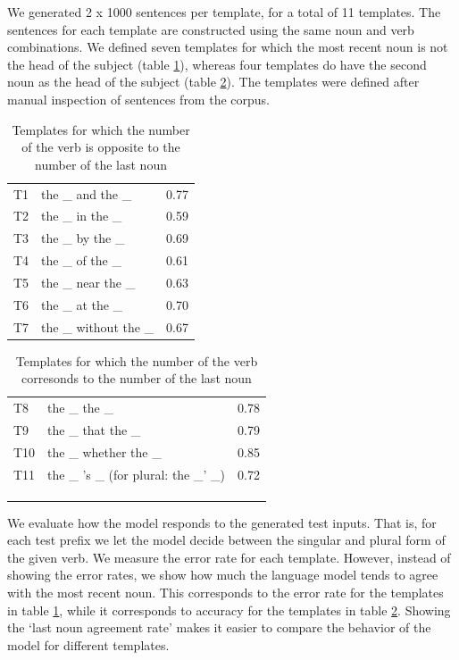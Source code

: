 We generated 2 x 1000 sentences per template,
for a total of 11 templates.
The sentences for each template are constructed using the same
noun and verb combinations.
We defined seven templates for which the most recent noun is 
not the head of the subject (table \ref{tab:attractor_templates}),
whereas four templates do have the second noun as the head of the subject
(table \ref{tab:lastnoun_templates}).
The templates were defined after manual inspection
of sentences from the corpus.

\begin{table}
\parbox{\linewidth}{
\centering
\begin{tabular}{ l l r }
  T1    & the \_ and the \_     &  0.77 \\
  T2    & the \_ in the \_      &  0.59 \\
  T3    & the \_ by the \_      &  0.69 \\
  T4    & the \_ of the \_      &  0.61 \\
  T5    & the \_ near the \_    &  0.63\\
  T6    & the \_ at the \_      &  0.70\\
  T7    & the \_ without the \_ & 0.67  \\
\end{tabular}
\caption{Templates for which the number of the verb 
is opposite to the number of the last noun} 
\label{tab:attractor_templates}
}
\end{table}


\begin{table}
\parbox{\linewidth}{
\centering
\begin{tabular}{ l l r }
  T8    & the \_ the \_         &  0.78\\
  T9    & the \_ that the \_    &  0.79\\
  T10   & the \_ whether the \_ &  0.85\\
  T11   & the \_ 's \_ (for plural: the \_' \_)          &  0.72 \\
\\
\\
\\
\end{tabular}
\caption{Templates for which the number of the verb 
corresonds to the number of the last noun} 
\label{tab:lastnoun_templates}
}
\end{table}


We evaluate how the model responds to the generated test inputs.
That is, for each test prefix we let the model decide between 
the singular and plural form of the given verb. 
We measure the error rate for each template.
However, instead of showing the error rates, we
show how much the language model tends to agree with the most recent noun.
This corresponds to the error rate for the templates in table \ref{tab:attractor_templates},
while it corresponds to accuracy for the templates in table \ref{tab:lastnoun_templates}.
Showing the `last noun agreement rate' makes it easier
to compare the behavior of the model for different templates.

